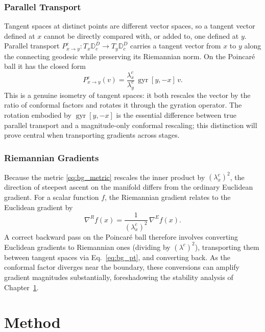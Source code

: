 \documentclass[12pt]{report}
\begin{document}
\subsection{Parallel Transport}
Tangent spaces at distinct points are different vector spaces, so a tangent vector defined at $x$ cannot be directly compared with, or added to, one defined at $y$. Parallel transport $P_{x \to y}^c : T_x\mathbb{D}_c^D \to T_y\mathbb{D}_c^D$ carries a tangent vector from $x$ to $y$ along the connecting geodesic while preserving its Riemannian norm. On the Poincar\'e ball it has the closed form
\begin{equation}
    \label{eq:bg_pt}
    P_{x \to y}^c(v) = \frac{\lambda_x^c}{\lambda_y^c}\,\operatorname{gyr}[y, -x]\,v.
\end{equation}
This is a genuine isometry of tangent spaces: it both rescales the vector by the ratio of conformal factors and rotates it through the gyration operator. The rotation embodied by $\operatorname{gyr}[y, -x]$ is the essential difference between true parallel transport and a magnitude-only conformal rescaling; this distinction will prove central when transporting gradients across stages.

\subsection{Riemannian Gradients}
Because the metric \ref{eq:bg_metric} rescales the inner product by $(\lambda_x^c)^2$, the direction of steepest ascent on the manifold differs from the ordinary Euclidean gradient. For a scalar function $f$, the Riemannian gradient relates to the Euclidean gradient by
\begin{equation}
    \label{eq:bg_riemgrad}
    \nabla^R f(x) = \frac{1}{(\lambda_x^c)^2}\,\nabla^E f(x).
\end{equation}
A correct backward pass on the Poincar\'e ball therefore involves converting Euclidean gradients to Riemannian ones (dividing by $(\lambda^c)^2$), transporting them between tangent spaces via Eq.~\ref{eq:bg_pt}, and converting back. As the conformal factor diverges near the boundary, these conversions can amplify gradient magnitudes substantially, foreshadowing the stability analysis of Chapter~\ref{chap:methods}.

\chapter{Method}
\label{chap:methods}
\end{document}
